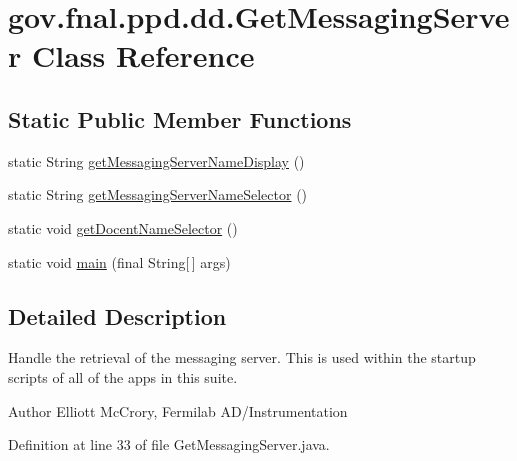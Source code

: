 \hypertarget{classgov_1_1fnal_1_1ppd_1_1dd_1_1GetMessagingServer}{\section{gov.\-fnal.\-ppd.\-dd.\-Get\-Messaging\-Server Class Reference}
\label{classgov_1_1fnal_1_1ppd_1_1dd_1_1GetMessagingServer}
}
\subsection*{Static Public Member Functions}
\begin{DoxyCompactItemize}
\item 
static String \hyperlink{classgov_1_1fnal_1_1ppd_1_1dd_1_1GetMessagingServer_a3b0e216307cae3742f3ff70aaf9ef8dc}{get\-Messaging\-Server\-Name\-Display} ()
\item 
static String \hyperlink{classgov_1_1fnal_1_1ppd_1_1dd_1_1GetMessagingServer_a61de9f8eb9c7e50565eb7d3d4f000cbb}{get\-Messaging\-Server\-Name\-Selector} ()
\item 
static void \hyperlink{classgov_1_1fnal_1_1ppd_1_1dd_1_1GetMessagingServer_afc14215a5c0b6624787c91e4d9501118}{get\-Docent\-Name\-Selector} ()
\item 
static void \hyperlink{classgov_1_1fnal_1_1ppd_1_1dd_1_1GetMessagingServer_a06768dfe96070006b7b3907a52def51e}{main} (final String\mbox{[}$\,$\mbox{]} args)
\end{DoxyCompactItemize}


\subsection{Detailed Description}
Handle the retrieval of the messaging server. This is used within the startup scripts of all of the apps in this suite.

\begin{DoxyAuthor}{Author}
Elliott Mc\-Crory, Fermilab A\-D/\-Instrumentation 
\end{DoxyAuthor}


Definition at line 33 of file Get\-Messaging\-Server.\-java.



